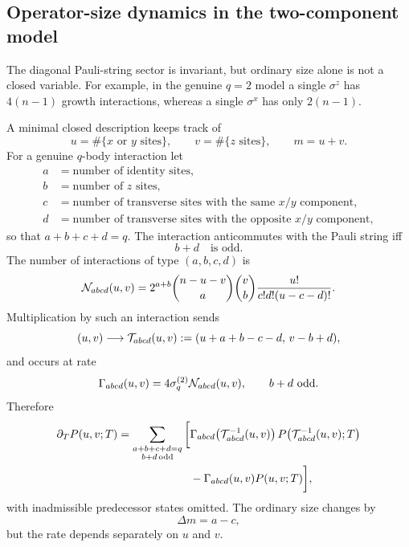 \documentclass{article}
\theoremstyle{definition}
\begin{document}
\subsection{Operator-size dynamics in the two-component model}

The diagonal Pauli-string sector is invariant, but ordinary size alone is
not a closed variable.  For example, in the genuine $q=2$ model a single
$\sigma^z$ has $4(n-1)$ growth interactions, whereas a single $\sigma^x$
has only $2(n-1)$.

A minimal closed description keeps track of
\begin{equation}
    u=\#\{x\text{ or }y\text{ sites}\},
    \qquad
    v=\#\{z\text{ sites}\},
    \qquad
    m=u+v.
\end{equation}
For a genuine $q$-body interaction let
\begin{align}
    a&=\text{number of identity sites},\nonumber\\
    b&=\text{number of $z$ sites},\nonumber\\
    c&=\text{number of transverse sites with the same $x/y$ component},
    \nonumber\\
    d&=\text{number of transverse sites with the opposite $x/y$ component},
\end{align}
so that $a+b+c+d=q$.  The interaction anticommutes with the Pauli string
iff
\begin{equation}
    b+d\quad\text{is odd}.
\end{equation}
The number of interactions of type $(a,b,c,d)$ is
\begin{equation}
    {\cal N}_{abcd}(u,v)
    =2^{a+b}
      \binom{n-u-v}{a}\binom vb
      \frac{u!}{c!d!(u-c-d)!}.
\end{equation}
Multiplication by such an interaction sends
\begin{equation}
    (u,v)\longrightarrow
    {\cal T}_{abcd}(u,v)
    :=(u+a+b-c-d,\,v-b+d),
\end{equation}
and occurs at rate
\begin{equation}
    \Gamma_{abcd}(u,v)
    =4\sigma_q^{(2)}{\cal N}_{abcd}(u,v),
    \qquad b+d\ \text{odd}.
\end{equation}
Therefore
\begin{align}
    \partial_TP(u,v;T)
    =\sum_{\substack{a+b+c+d=q\\b+d\,\text{odd}}}
    \bigg[&
       \Gamma_{abcd}\!\left({\cal T}_{abcd}^{-1}(u,v)\right)
       P\!\left({\cal T}_{abcd}^{-1}(u,v);T\right)
       \nonumber\\
       &-\Gamma_{abcd}(u,v)P(u,v;T)
    \bigg],
\end{align}
with inadmissible predecessor states omitted.  The ordinary size changes by
\begin{equation}
    \Delta m=a-c,
\end{equation}
but the rate depends separately on $u$ and $v$.
\end{document}
